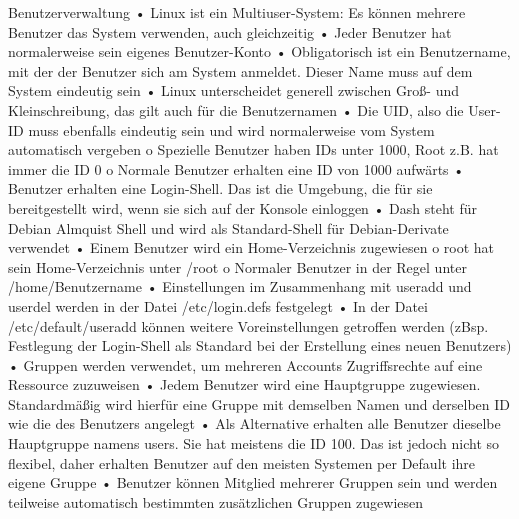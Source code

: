 Benutzerverwaltung
• Linux ist ein Multiuser-System: Es können mehrere Benutzer das System verwenden, auch
gleichzeitig
• Jeder Benutzer hat normalerweise sein eigenes Benutzer-Konto
• Obligatorisch ist ein Benutzername, mit der der Benutzer sich am System anmeldet. Dieser
Name muss auf dem System eindeutig sein
• Linux unterscheidet generell zwischen Groß- und Kleinschreibung, das gilt auch für die
Benutzernamen
• Die UID, also die User-ID muss ebenfalls eindeutig sein und wird normalerweise vom System
automatisch vergeben
o Spezielle Benutzer haben IDs unter 1000, Root z.B. hat immer die ID 0
o Normale Benutzer erhalten eine ID von 1000 aufwärts
• Benutzer erhalten eine Login-Shell. Das ist die Umgebung, die für sie bereitgestellt wird,
wenn sie sich auf der Konsole einloggen
• Dash steht für Debian Almquist Shell und wird als Standard-Shell für Debian-Derivate
verwendet
• Einem Benutzer wird ein Home-Verzeichnis zugewiesen
o root hat sein Home-Verzeichnis unter /root
o Normaler Benutzer in der Regel unter /home/Benutzername
• Einstellungen im Zusammenhang mit useradd und userdel werden in der Datei
/etc/login.defs festgelegt
• In der Datei /etc/default/useradd können weitere Voreinstellungen getroffen werden
(zBsp. Festlegung der Login-Shell als Standard bei der Erstellung eines neuen Benutzers)
• Gruppen werden verwendet, um mehreren Accounts Zugriffsrechte auf eine Ressource
zuzuweisen
• Jedem Benutzer wird eine Hauptgruppe zugewiesen. Standardmäßig wird hierfür eine
Gruppe mit demselben Namen und derselben ID wie die des Benutzers angelegt
• Als Alternative erhalten alle Benutzer dieselbe Hauptgruppe namens users. Sie hat meistens
die ID 100. Das ist jedoch nicht so flexibel, daher erhalten Benutzer auf den meisten
Systemen per Default ihre eigene Gruppe
• Benutzer können Mitglied mehrerer Gruppen sein und werden teilweise automatisch
bestimmten zusätzlichen Gruppen zugewiesen